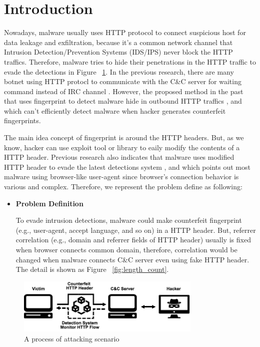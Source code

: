\section{Introduction}

Nowadays, malware usually uses HTTP protocol to connect suspicious host for data leakage and exfiltration, because it's a common network channel that Intrusion Detection/Prevention Systems (IDS/IPS) never block the HTTP traffics. Therefore, malware tries to hide their penetrations in the HTTP traffic to evade the detections in Figure ~\ref{fig:attack}. In the previous research, there are many botnet using HTTP protocl to communicate with the C\&C server for waiting command instead of IRC channel \cite{gu2008botsniffer}. However, the proposed method in the past that uses fingerprint to detect malware hide in outbound HTTP traffics \cite{bortolameotti2017decanter}, and which can't efficiently detect malware when hacker generates counterfeit fingerprints.  

The main idea concept of fingerprint is around the HTTP headers. But, as we know, hacker can use exploit tool or library to eaily modify the contents of a HTTP header. Previous research also indicates that malware uses modified HTTP header to evade the latest detections system \cite{grill2014malware}, and which points out most malware using browser-like user-agent since browser's connection behavior is various and complex. Therefore, we represent the problem define as following:

\begin{itemize}

\item {\bf Problem Definition}

To evade intrusion detections, malware could make counterfeit fingerprint (e.g., user-agent, accept language, and so on) in a HTTP header. But, referrer correlation (e.g., domain and referrer fields of HTTP header) usually is fixed when browser connects common domain, therefore, correlation would be changed when malware connects C\&C server even using fake HTTP header. The detail is shown as Figure ~\ref{fig:length_count}.

\end{itemize}

\begin{figure}[!t]
\centering
\includegraphics[width=250pt]{image/attack.png}
\caption{A process of attacking scenario}
\label{fig:attack}
\end{figure}

